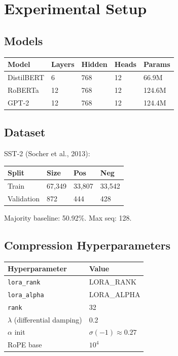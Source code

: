 \section{Experimental Setup}

\subsection{Models}

\begin{table}[H]
\centering
\small
\begin{tabular}{lllll}
\toprule
\textbf{Model} & \textbf{Layers} & \textbf{Hidden} & \textbf{Heads} & \textbf{Params} \\
\midrule
DistilBERT & 6 & 768 & 12 & 66.9M \\
RoBERTa & 12 & 768 & 12 & 124.6M \\
GPT-2 & 12 & 768 & 12 & 124.4M \\
\bottomrule
\end{tabular}
\end{table}

\subsection{Dataset}

SST-2 (Socher et al., 2013):

\begin{table}[H]
\centering
\small
\begin{tabular}{llll}
\toprule
\textbf{Split} & \textbf{Size} & \textbf{Pos} & \textbf{Neg} \\
\midrule
Train & 67,349 & 33,807 & 33,542 \\
Validation & 872 & 444 & 428 \\
\bottomrule
\end{tabular}
\end{table}

Majority baseline: 50.92\%. Max seq: 128.

\subsection{Compression Hyperparameters}

\begin{table}[H]
\centering
\small
\begin{tabular}{ll}
\toprule
\textbf{Hyperparameter} & \textbf{Value} \\
\midrule
\texttt{lora\_rank} & {{LORA\_RANK}} \\
\texttt{lora\_alpha} & {{LORA\_ALPHA}} \\
\texttt{rank} & 32 \\
$\lambda$ (differential damping) & 0.2 \\
$\alpha$ init & $\sigma(-1) \approx 0.27$ \\
RoPE base & $10^4$ \\
\bottomrule
\end{tabular}
\end{table}

